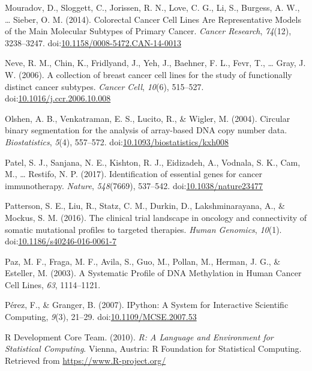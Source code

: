 \documentclass[man,floatsintext]{apa6}
\begin{document}
\hypertarget{ref-mouradov2014}{}
Mouradov, D., Sloggett, C., Jorissen, R. N., Love, C. G., Li, S.,
Burgess, A. W., \ldots{} Sieber, O. M. (2014). Colorectal Cancer Cell
Lines Are Representative Models of the Main Molecular Subtypes of
Primary Cancer. \emph{Cancer Research}, \emph{74}(12), 3238--3247.
doi:\href{https://doi.org/10.1158/0008-5472.CAN-14-0013}{10.1158/0008-5472.CAN-14-0013}

\hypertarget{ref-neve2006}{}
Neve, R. M., Chin, K., Fridlyand, J., Yeh, J., Baehner, F. L., Fevr, T.,
\ldots{} Gray, J. W. (2006). A collection of breast cancer cell lines
for the study of functionally distinct cancer subtypes. \emph{Cancer
Cell}, \emph{10}(6), 515--527.
doi:\href{https://doi.org/10.1016/j.ccr.2006.10.008}{10.1016/j.ccr.2006.10.008}

\hypertarget{ref-olshen2004}{}
Olshen, A. B., Venkatraman, E. S., Lucito, R., \& Wigler, M. (2004).
Circular binary segmentation for the analysis of array-based DNA copy
number data. \emph{Biostatistics}, \emph{5}(4), 557--572.
doi:\href{https://doi.org/10.1093/biostatistics/kxh008}{10.1093/biostatistics/kxh008}

\hypertarget{ref-patel2017}{}
Patel, S. J., Sanjana, N. E., Kishton, R. J., Eidizadeh, A., Vodnala, S.
K., Cam, M., \ldots{} Restifo, N. P. (2017). Identification of essential
genes for cancer immunotherapy. \emph{Nature}, \emph{548}(7669),
537--542.
doi:\href{https://doi.org/10.1038/nature23477}{10.1038/nature23477}

\hypertarget{ref-patterson2016}{}
Patterson, S. E., Liu, R., Statz, C. M., Durkin, D., Lakshminarayana,
A., \& Mockus, S. M. (2016). The clinical trial landscape in oncology
and connectivity of somatic mutational profiles to targeted therapies.
\emph{Human Genomics}, \emph{10}(1).
doi:\href{https://doi.org/10.1186/s40246-016-0061-7}{10.1186/s40246-016-0061-7}

\hypertarget{ref-paz2003}{}
Paz, M. F., Fraga, M. F., Avila, S., Guo, M., Pollan, M., Herman, J. G.,
\& Esteller, M. (2003). A Systematic Profile of DNA Methylation in Human
Cancer Cell Lines, \emph{63}, 1114--1121.

\hypertarget{ref-perez2007}{}
Pérez, F., \& Granger, B. (2007). IPython: A System for Interactive
Scientific Computing, \emph{9}(3), 21--29.
doi:\href{https://doi.org/10.1109/MCSE.2007.53}{10.1109/MCSE.2007.53}

\hypertarget{ref-rdevelopmentcoreteam2010}{}
R Development Core Team. (2010). \emph{R: A Language and Environment for
Statistical Computing}. Vienna, Austria: R Foundation for Statistical
Computing. Retrieved from \url{https://www.R-project.org/}
\end{document}
